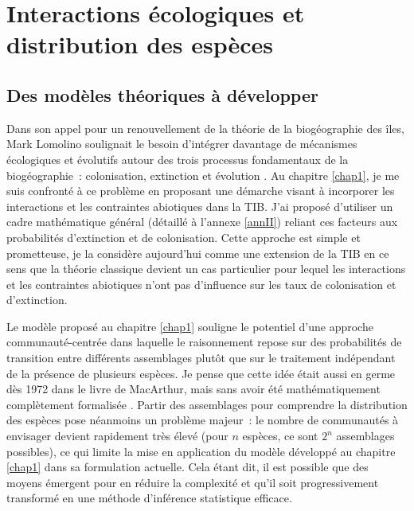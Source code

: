 \section*{Interactions écologiques et distribution des
espèces}\label{interactions-uxe9cologiques-et-distribution-des-espuxe8ces}

\subsection*{Des modèles théoriques à
développer}\label{des-moduxe8les-thuxe9oriques-uxe0-duxe9velopper}

Dans son appel pour un renouvellement de la théorie de la biogéographie
des îles, Mark Lomolino soulignait le besoin d'intégrer davantage de
mécanismes écologiques et évolutifs autour des trois processus
fondamentaux de la biogéographie~: colonisation, extinction et évolution
\citep{Lomolino2000}. Au chapitre \ref{chap1}, je me suis confronté à ce
problème en proposant une démarche visant à incorporer les interactions
et les contraintes abiotiques dans la TIB. J'ai proposé d'utiliser un
cadre mathématique général (détaillé à l'annexe \ref{annII}) reliant ces
facteurs aux probabilités d'extinction et de colonisation. Cette
approche est simple et prometteuse, je la considère aujourd'hui comme
une extension de la TIB en ce sens que la théorie classique devient un
cas particulier pour lequel les interactions et les contraintes
abiotiques n'ont pas d'influence sur les taux de colonisation et
d'extinction.

Le modèle proposé au chapitre \ref{chap1} souligne le potentiel d'une
approche communauté-centrée dans laquelle le raisonnement repose sur des
probabilités de transition entre différents assemblages
\citep{Cazelles2016a} plutôt que sur le traitement indépendant de la
présence de plusieurs espèces. Je pense que cette idée était aussi en
germe dès 1972 dans le livre de MacArthur, mais sans avoir été
mathématiquement complètement formalisée
\citep{macarthur1972geographical}. Partir des assemblages pour
comprendre la distribution des espèces pose néanmoins un problème
majeur~: le nombre de communautés à envisager devient rapidement très
élevé (pour \(n\) espèces, ce sont \(2^n\) assemblages possibles), ce
qui limite la mise en application du modèle développé au chapitre
\ref{chap1} dans sa formulation actuelle. Cela étant dit, il est
possible que des moyens émergent pour en réduire la complexité et qu'il
soit progressivement transformé en une méthode d'inférence statistique
efficace.

